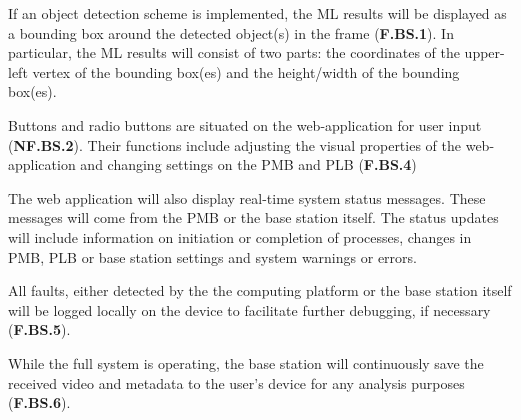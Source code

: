 If an object detection scheme is implemented, the ML results will be displayed as a bounding box around the detected object(s) in the frame (\textbf{F.BS.1}). In particular, the ML results will consist of two parts: the coordinates of the upper-left vertex of the bounding box(es) and the height/width of the bounding box(es).

Buttons and radio buttons are situated on the web-application for user input (\textbf{NF.BS.2}). Their functions include adjusting the visual properties of the web-application and changing settings on the PMB and PLB (\textbf{F.BS.4})

The web application will also display real-time system status messages. These messages will come from the PMB or the base station itself. The status updates will include information on initiation or completion of processes, changes in PMB, PLB or base station settings and system warnings or errors.

All faults, either detected by the the computing platform or the base station itself will be logged locally on the device to facilitate further debugging, if necessary (\textbf{F.BS.5}).

While the full system is operating, the base station will continuously save the received video and metadata to the user's device for any analysis purposes (\textbf{F.BS.6}).
